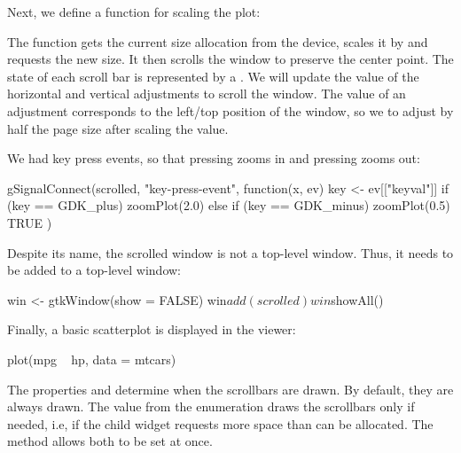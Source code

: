 Next, we define a function for scaling the plot:
\begin{Schunk}
\end{Schunk}
%
The function gets the current size allocation from the device, scales
it by  and requests the new size. It then scrolls the window
to preserve the center point. The state of each scroll bar is
represented by a .  We will update the value of
the horizontal and vertical adjustments to scroll the window.  The
value of an adjustment corresponds to the left/top position of the
window, so we to adjust by half the page size after scaling the value.

We had key press events, so that pressing \kbd{+} zooms in and
pressing \kbd{-} zooms out:
\begin{Schunk}
\begin{Sinput}
 gSignalConnect(scrolled, "key-press-event", function(x, ev) {
   key <- ev[["keyval"]]
   if (key == GDK_plus)
     zoomPlot(2.0)
   else if (key == GDK_minus)
     zoomPlot(0.5)
   TRUE
 })
\end{Sinput}
\end{Schunk}

Despite its name, the scrolled window is not a top-level window. Thus,
it needs to be added to a top-level window:
\begin{Schunk}
\begin{Sinput}
 win <- gtkWindow(show = FALSE)
 win$add(scrolled)
 win$showAll()
\end{Sinput}
\end{Schunk}
 
Finally, a basic scatterplot is displayed in the viewer:
\begin{Schunk}
\begin{Sinput}
 plot(mpg ~ hp, data = mtcars)
\end{Sinput}
\end{Schunk}

The properties  and 
determine when the scrollbars are drawn. By default, they are always
drawn. The  value from the 
enumeration draws the scrollbars only if needed, i.e, if the child
widget requests more space than can be allocated. The
 method allows both to be set at
once.

